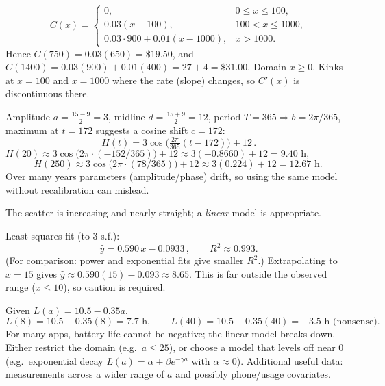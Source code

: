 \documentclass[11pt]{article}
\begin{document}
\begin{solution}

\[
\boxed{\,C(x)=
\begin{cases}
0, & 0\le x\le 100,\\[2pt]
0.03(x-100), & 100< x\le 1000,\\[2pt]
0.03\cdot 900 + 0.01(x-1000), & x>1000.
\end{cases}}
\]
Hence $C(750)=0.03(650)=\boxed{\$19.50}$, and
$C(1400)=0.03(900)+0.01(400)=27+4=\boxed{\$31.00}$.
Domain $x\ge 0$. Kinks at $x=100$ and $x=1000$ where the rate (slope) changes, so $C'(x)$ is discontinuous there.
\end{solution}

\begin{solution}
Amplitude $a=\tfrac{15-9}{2}=3$, midline $d=\tfrac{15+9}{2}=12$, period $T=365\Rightarrow b=2\pi/365$, maximum at $t=172$ suggests a cosine shift $c=172$:
\[
\boxed{\,H(t)=3\cos\!\Big(\tfrac{2\pi}{365}(t-172)\Big)+12\,}.
\]
$H(20)\approx 3\cos\!\big(2\pi\cdot(-152/365)\big)+12\approx 3(-0.8660)+12=\boxed{9.40\text{ h}},$
\[
H(250)\approx 3\cos\!\big(2\pi\cdot(78/365)\big)+12\approx 3(0.224)+12=\boxed{12.67\text{ h}}.
\]
Over many years parameters (amplitude/phase) drift, so using the same model without recalibration can mislead.
\end{solution}

\begin{solution}
The scatter is increasing and nearly straight; a \emph{linear} model is appropriate.

Least-squares fit (to 3 s.f.):
\[
\boxed{\,\hat y=0.590\,x-0.0933\,},\qquad R^2\approx \boxed{0.993}.
\]
(For comparison: power and exponential fits give smaller $R^2$.)  
Extrapolating to $x=15$ gives $\hat y\approx 0.590(15)-0.093\approx 8.65$. This is far outside the observed range ($x\le 10$), so caution is required.
\end{solution}

\begin{solution}
Given $L(a)=10.5-0.35a$,
\[
L(8)=10.5-0.35(8)=\boxed{7.7\text{ h}},\qquad
L(40)=10.5-0.35(40)=\boxed{-3.5\text{ h (nonsense)}}.
\]
For many apps, battery life cannot be negative; the linear model breaks down.  
Either restrict the domain (e.g.\ $a\le 25$), or choose a model that levels off near $0$ (e.g.\ exponential decay $L(a)=\alpha+\beta e^{-\gamma a}$ with $\alpha\approx 0$).
Additional useful data: measurements across a wider range of $a$ and possibly phone/usage covariates.
\end{solution}
\end{document}
